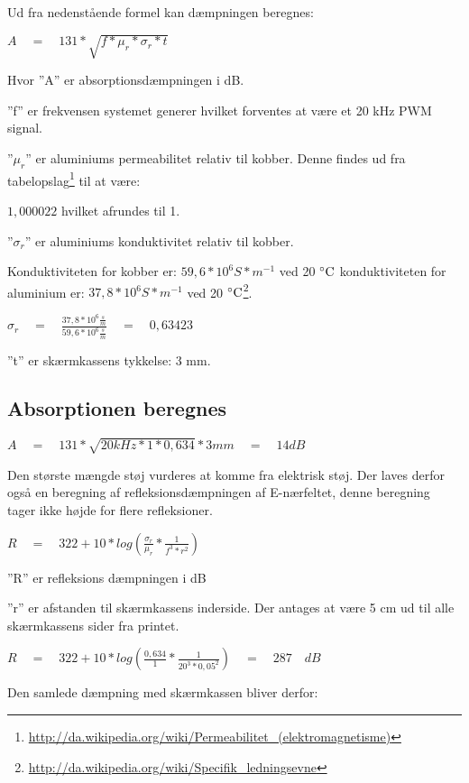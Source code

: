 Ud fra nedenstående formel kan dæmpningen beregnes:

$A\quad =\quad 131*\sqrt { f*{ \mu  }_{ r }*{ \sigma  }_{ r }*t }$

Hvor ''A'' er absorptionsdæmpningen i dB.

''f'' er frekvensen systemet generer hvilket forventes at være et 20 kHz PWM signal.

''${ \mu  }_{ r }$'' er aluminiums permeabilitet relativ til kobber. Denne findes ud fra tabelopslag\footnote{\url{http://da.wikipedia.org/wiki/Permeabilitet_(elektromagnetisme)}} til at være: 

$1,000022$ hvilket afrundes til 1.

''${ \sigma  }_{ r }$'' er aluminiums konduktivitet relativ til kobber.

Konduktiviteten for kobber er: $59,6*{ 10 }^{ 6 }S*{ m }^{ -1 }$ ved 20 $^{\circ}\text{C}$ \newline
konduktiviteten for aluminium er: $37,8*{ 10 }^{ 6 }S*{ m }^{ -1 }$ ved 20 $^{\circ}\text{C}$\footnote{\url{http://da.wikipedia.org/wiki/Specifik_ledningsevne}}.

${ \sigma  }_{ r }\quad =\quad \frac { 37,8*{ 10 }^{ 6 }\frac { s }{ m }  }{ 59,6*{ 10 }^{ 6 }\frac { s }{ m }  } \quad =\quad 0,63423$

''t'' er skærmkassens tykkelse: 3 mm.

\subsection*{Absorptionen beregnes}

$A\quad =\quad 131*\sqrt { 20kHz*1*0,634 } *3mm\quad =\quad 14dB$

Den største mængde støj vurderes at komme fra elektrisk støj. Der laves derfor også en beregning af refleksionsdæmpningen af E-nærfeltet, denne beregning tager ikke højde for flere refleksioner.

$R\quad =\quad 322+10*log(\frac { { \sigma  }_{ r } }{ { \mu  }_{ r } } *\frac { 1 }{ { f }^{ 3 }*{ r }^{ 2 } } )$

''R'' er refleksions dæmpningen i dB

''r'' er afstanden til skærmkassens inderside. Der antages at være 5 cm ud til alle skærmkassens sider fra printet.

$R\quad =\quad 322+10*log(\frac { 0,634 }{ 1 } *\frac { 1 }{ { 20 }^{ 3 }*{ 0,05 }^{ 2 } } )\quad =\quad 287\quad dB$

Den samlede dæmpning med skærmkassen bliver derfor:

